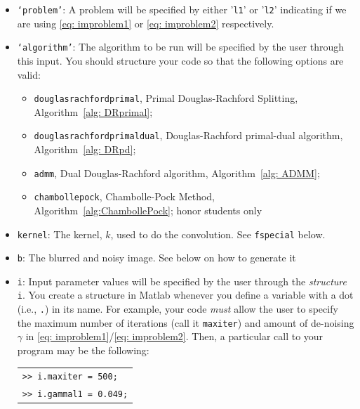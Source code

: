 \documentclass[12pt]{article}
\begin{document}
\begin{itemize}
  \item \texttt{`problem'}: A problem will be specified by either '\texttt{l1}' or '\texttt{l2}' indicating if we are using \eqref{eq: improblem1} or \eqref{eq: improblem2} respectively. 
  \item \texttt{`algorithm'}: The algorithm to be run will be specified by the user through this input.  You should structure your code so that the following options are valid:
  \begin{itemize}
    \item \texttt{douglasrachfordprimal}, Primal Douglas-Rachford Splitting, Algorithm~\ref{alg: DRprimal};
    \item \texttt{douglasrachfordprimaldual}, Douglas-Rachford primal-dual algorithm, Algorithm~\ref{alg: DRpd};
    \item \texttt{admm}, Dual Douglas-Rachford algorithm, Algorithm~\ref{alg: ADMM};
    \item \texttt{chambollepock}, Chambolle-Pock Method, Algorithm~\ref{alg:ChambollePock}; honor students only
  \end{itemize}
  \item \texttt{kernel}: The kernel, $k$, used to do the convolution. See \texttt{fspecial} below. 
  \item \texttt{b}: The blurred and noisy image. See below on how to generate it
  \item \texttt{i}: Input parameter values will be specified by the user through the \emph{structure} \texttt{i}.  You create a structure in Matlab whenever you define a variable with a dot (i.e., \texttt{.}) in its name.  For example, your code \emph{must} allow the user to specify the maximum number of iterations (call it \texttt{maxiter}) and amount of de-noising $\gamma$ in \eqref{eq: improblem1}/\eqref{eq: improblem2}.  Then, a particular call to your program may be the following:
  \begin{center} \begin{tabular}{l}\texttt{>> i.maxiter = 500;}\\\texttt{>> i.gammal1 = 0.049;}\\

\end{tabular}
\end{center}
\end{itemize}
\end{document}
